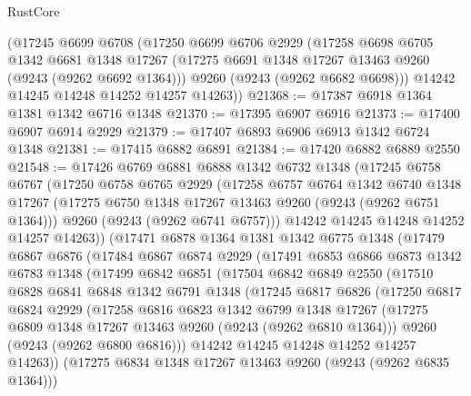 \begin{lexlean}{RustCore}
\begin{coremodule}
    (@17245
      @6699
      @6708
      (@17250
        @6699
        @6706
        @2929
        (@17258
          @6698
          @6705
          @1342
          @6681
          @1348
          @17267
          (@17275 @6691 @1348 @17267 @13463 @9260 (@9243 (@9262 @6692 @1364)))
          @9260
          (@9243 (@9262 @6682 @6698)))
        @14242
        @14245
        @14248
        @14252
        @14257
        @14263))
@21368 := @17387 @6918 @1364 @1381 @1342 @6716 @1348
@21370 := @17395 @6907 @6916
@21373 := @17400 @6907 @6914 @2929
@21379 := @17407 @6893 @6906 @6913 @1342 @6724 @1348
@21381 := @17415 @6882 @6891
@21384 := @17420 @6882 @6889 @2550
@21548 := @17426
    @6769
    @6881
    @6888
    @1342
    @6732
    @1348
    (@17245
      @6758
      @6767
      (@17250
        @6758
        @6765
        @2929
        (@17258
          @6757
          @6764
          @1342
          @6740
          @1348
          @17267
          (@17275 @6750 @1348 @17267 @13463 @9260 (@9243 (@9262 @6751 @1364)))
          @9260
          (@9243 (@9262 @6741 @6757)))
        @14242
        @14245
        @14248
        @14252
        @14257
        @14263))
    (@17471
      @6878
      @1364
      @1381
      @1342
      @6775
      @1348
      (@17479
        @6867
        @6876
        (@17484
          @6867
          @6874
          @2929
          (@17491
            @6853
            @6866
            @6873
            @1342
            @6783
            @1348
            (@17499
              @6842
              @6851
              (@17504
                @6842
                @6849
                @2550
                (@17510
                  @6828
                  @6841
                  @6848
                  @1342
                  @6791
                  @1348
                  (@17245
                    @6817
                    @6826
                    (@17250
                      @6817
                      @6824
                      @2929
                      (@17258
                        @6816
                        @6823
                        @1342
                        @6799
                        @1348
                        @17267
                        (@17275 @6809 @1348 @17267 @13463 @9260 (@9243 (@9262 @6810 @1364)))
                        @9260
                        (@9243 (@9262 @6800 @6816)))
                      @14242
                      @14245
                      @14248
                      @14252
                      @14257
                      @14263))
                  (@17275 @6834 @1348 @17267 @13463 @9260 (@9243 (@9262 @6835 @1364)))

\end{coremodule}
\end{lexlean}
